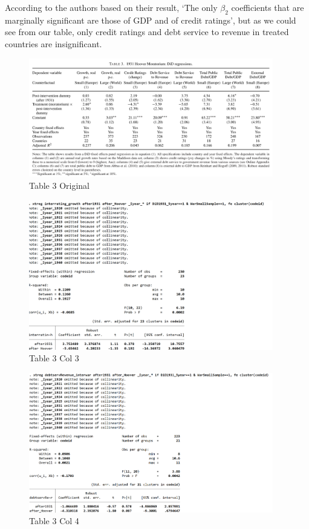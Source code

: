 According to the authors based on their result, `The only $\beta_2$ coefficients that are marginally significant are those of GDP and of credit ratings',
but as we could see from our table, only credit ratings and debt service to revenue in treated countries are insignificant.

\begin{figure}[ht!]
    \centering
    \includegraphics[width=0.95\textwidth]{figures/table3_original.png}
    \caption{Table 3 Original}
    \label{fig:table3_original}
\end{figure}

\begin{figure}[ht!]
    \centering
    \includegraphics[width=0.95\textwidth]{figures/col3_tab3_stata.png}
    \caption{Table 3 Col 3}
    \label{fig:table3_col3}
\end{figure}

\begin{figure}[ht!]
    \centering
    \includegraphics[width=0.95\textwidth]{figures/col4_tab3_stata.png}
    \caption{Table 3 Col 4}
    \label{fig:table3_col4}
\end{figure}

